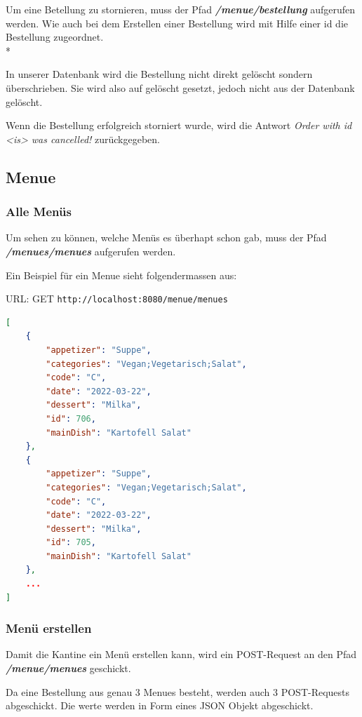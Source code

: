 Um eine Betellung zu stornieren, muss der Pfad \textbf{\textit{/menue/bestellung}} aufgerufen werden. Wie auch bei dem Erstellen einer Bestellung wird 
mit Hilfe einer id die Bestellung zugeordnet. \\*

In unserer Datenbank wird die Bestellung nicht direkt gelöscht sondern überschrieben. Sie wird also auf gelöscht gesetzt, jedoch nicht aus der Datenbank gelöscht.

Wenn die Bestellung erfolgreich storniert wurde, wird die Antwort \textit{Order with id <is> was cancelled!} zurückgegeben.

\subsection{Menue}

\subsubsection{Alle Menüs}

Um sehen zu können, welche Menüs es überhapt schon gab, muss der Pfad \textbf{\textit{/menues/menues}} aufgerufen werden. 

Ein Beispiel für ein Menue sieht folgendermassen aus:

URL: GET \colorbox{white}{\lstinline[basicstyle=\ttfamily\color{black},language=html]|http://localhost:8080/menue/menues|}


\begin{lstlisting}[language=json,firstnumber=1]
[
    {
        "appetizer": "Suppe",
        "categories": "Vegan;Vegetarisch;Salat",
        "code": "C",
        "date": "2022-03-22",
        "dessert": "Milka",
        "id": 706,
        "mainDish": "Kartofell Salat"
    },
    {
        "appetizer": "Suppe",
        "categories": "Vegan;Vegetarisch;Salat",
        "code": "C",
        "date": "2022-03-22",
        "dessert": "Milka",
        "id": 705,
        "mainDish": "Kartofell Salat"
    },
    ...
]
\end{lstlisting}

\subsubsection{Menü erstellen}

Damit die Kantine ein Menü erstellen kann, wird ein POST-Request an den Pfad \textbf{\textit{/menue/menues}} geschickt.

Da eine Bestellung aus genau 3 Menues besteht, werden auch 3 POST-Requests abgeschickt. Die werte werden in Form eines JSON Objekt abgeschickt.

